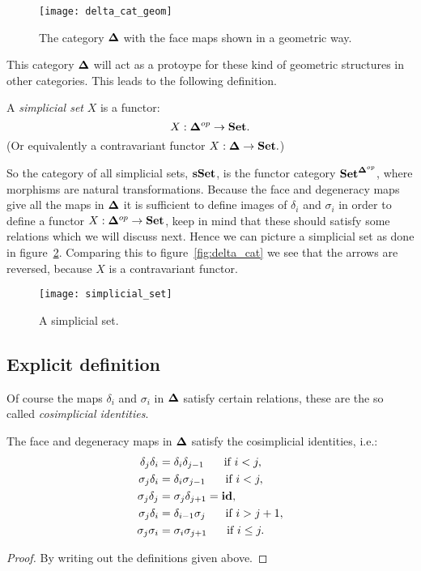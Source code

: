 \begin{figure}
	\texttt{[image: delta\_cat\_geom]}
	\caption{The category $\mathbf{\Delta}$ with the face maps shown in a geometric way.}
	\label{fig:delta_cat_geom}
\end{figure}

This category $\mathbf{\Delta}$ will act as a protoype for these kind of geometric structures in other categories. This leads to the following definition.

\begin{definition}
	A \emph{simplicial set} $X$ is a functor:
	$$X: \mathbf{\Delta}^{op} \to \mathbf{Set}.$$
	(Or equivalently a contravariant functor $X: \mathbf{\Delta} \to \mathbf{Set}.$)
\end{definition}

So the category of all simplicial sets, $\mathbf{sSet}$, is the functor category $\mathbf{Set}^{\mathbf{\Delta}^{op}}$, where morphisms are natural transformations. Because the face and degeneracy maps give all the maps in $\mathbf{\Delta}$ it is sufficient to define images of $\delta_i$ and $\sigma_i$ in order to define a functor $X: \mathbf{\Delta}^{op} \to \mathbf{Set}$, keep in mind that these should satisfy some relations which we will discuss next. Hence we can picture a simplicial set as done in figure~\ref{fig:simplicial_set}. Comparing this to figure~\ref{fig:delta_cat} we see that the arrows are reversed, because $X$ is a contravariant functor.

\begin{figure}
	\texttt{[image: simplicial\_set]}
	\caption{A simplicial set.}
	\label{fig:simplicial_set}
\end{figure}


\subsection{Explicit definition}
Of course the maps $\delta_i$ and $\sigma_i$ in $\mathbf{\Delta}$ satisfy certain relations, these are the so called \emph{cosimplicial identities}.

\begin{lemma}
	The face and degeneracy maps in $\mathbf{\Delta}$ satisfy the cosimplicial identities, i.e.:
	\begin{align}
		\delta_j\delta_i &= \delta_i\delta_{j-1}  \hspace{0.5cm} \text{ if } i < j,\\
		\sigma_j\delta_i &= \delta_i\sigma_{j-1}  \hspace{0.5cm} \text{ if } i < j,\\
		\sigma_j\delta_j &= \sigma_j\delta_{j+1} = \mathbf{id},\\
		\sigma_j\delta_i &= \delta_{i-1}\sigma_j  \hspace{0.5cm} \text{ if } i > j+1,\\
		\sigma_j\sigma_i &= \sigma_i\sigma_{j+1}  \hspace{0.5cm} \text{ if } i \leq j.
	\end{align}
\end{lemma}
\begin{proof}
	By writing out the definitions given above. 
\end{proof}

